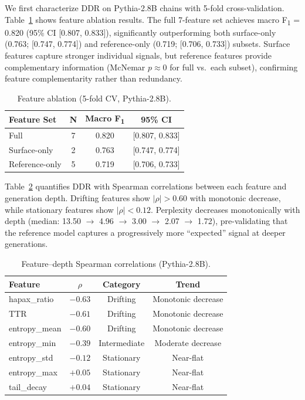 \documentclass[11pt,a4paper]{article}
\newcommand{\fone}{F\textsubscript{1}}
\newcommand{\rhosp}{\rho}
\begin{document}
We first characterize DDR on Pythia-2.8B chains with 5-fold cross-validation.
Table~\ref{tab:ablation} shows feature ablation results.
The full 7-feature set achieves macro \fone{} = 0.820 (95\% CI [0.807, 0.833]),
significantly outperforming both surface-only (0.763; [0.747, 0.774]) and reference-only (0.719; [0.706, 0.733]) subsets.
Surface features capture stronger individual signals, but reference features provide complementary information
(McNemar $p \approx 0$ for full vs.\ each subset), confirming feature complementarity rather than redundancy.

\begin{table}[t]
\centering
\caption{Feature ablation (5-fold CV, Pythia-2.8B).}
\label{tab:ablation}
\begin{tabular}{lccc}
\toprule
\textbf{Feature Set} & \textbf{N} & \textbf{Macro \fone{}} & \textbf{95\% CI} \\
\midrule
Full & 7 & 0.820 & {[0.807, 0.833]} \\
Surface-only & 2 & 0.763 & {[0.747, 0.774]} \\
Reference-only & 5 & 0.719 & {[0.706, 0.733]} \\
\bottomrule
\end{tabular}
\end{table}

Table~\ref{tab:spearman} quantifies DDR with Spearman correlations between each feature and generation depth.
Drifting features show $|\rhosp| > 0.60$ with monotonic decrease, while stationary features show $|\rhosp| < 0.12$.
Perplexity decreases monotonically with depth (median: 13.50 $\to$ 4.96 $\to$ 3.00 $\to$ 2.07 $\to$ 1.72),
pre-validating that the reference model captures a progressively more ``expected'' signal at deeper generations.

\begin{table}[t]
\centering
\caption{Feature--depth Spearman correlations (Pythia-2.8B).}
\label{tab:spearman}
\begin{tabular}{lccc}
\toprule
\textbf{Feature} & $\rhosp$ & \textbf{Category} & \textbf{Trend} \\
\midrule
hapax\_ratio & $-0.63$ & Drifting & Monotonic decrease \\
TTR & $-0.61$ & Drifting & Monotonic decrease \\
entropy\_mean & $-0.60$ & Drifting & Monotonic decrease \\
entropy\_min & $-0.39$ & Intermediate & Moderate decrease \\
entropy\_std & $-0.12$ & Stationary & Near-flat \\
entropy\_max & $+0.05$ & Stationary & Near-flat \\
tail\_decay & $+0.04$ & Stationary & Near-flat \\
\bottomrule
\end{tabular}
\end{table}
\end{document}
